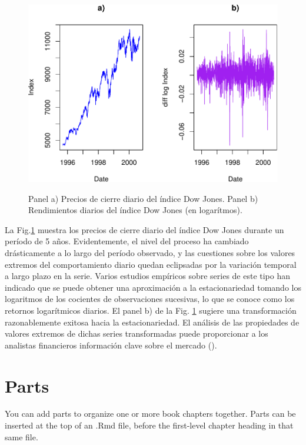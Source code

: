 \documentclass[
  20pt,
]{book}
\theoremstyle{definition}
\theoremstyle{definition}
\theoremstyle{definition}
\theoremstyle{definition}
\theoremstyle{remark}
\begin{document}
\begin{figure}

{\centering \includegraphics[width=0.8\linewidth,alt={Panel izquierdo: precios de cierre diario del índice Dow Jones.Panel derecho: rendimientos logarítmicos diarios del índice Dow Jones.}]{Extremales_files/figure-latex/nice-fig4-1} 

}

\caption{Panel a) Precios de cierre diario del índice Dow Jones. Panel b) Rendimientos diarios del índice Dow Jones (en logarítmos).}\label{fig:nice-fig4}
\end{figure}

La Fig.\ref{fig:nice-fig4} muestra los precios de cierre diario del índice Dow Jones durante un período de 5 años. Evidentemente, el nivel del proceso ha cambiado drásticamente a lo largo del período observado, y las cuestiones sobre los valores extremos del comportamiento diario quedan eclipsadas por la variación temporal a largo plazo en la serie. Varios estudios empíricos sobre series de este tipo han indicado que se puede obtener una aproximación a la estacionariedad tomando los logaritmos de los cocientes de observaciones sucesivas, lo que se conoce como los retornos logarítmicos diarios. El panel b) de la Fig. \ref{fig:nice-fig4} sugiere una transformación razonablemente exitosa hacia la estacionariedad. El análisis de las propiedades de valores extremos de dichas series transformadas puede proporcionar a los analistas financieros información clave sobre el mercado (\citet{coles2001introduction}).

\chapter{Parts}\label{parts}

You can add parts to organize one or more book chapters together. Parts can be inserted at the top of an .Rmd file, before the first-level chapter heading in that same file.
\end{document}
